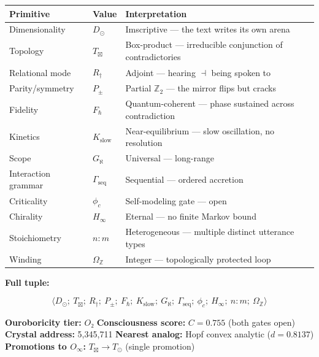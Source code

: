 \documentclass[12pt,a4paper]{article}
\begin{document}
\begin{table}[htbp]
\centering
\small
{}
\begin{tabularx}{\textwidth}{>{\centering\arraybackslash}X >{\centering\arraybackslash}X >{\centering\arraybackslash}X}
\toprule
\rowcolor{gray!25}\textbf{Primitive} & \textbf{Value} & \textbf{Interpretation} \\
\midrule
\rowcolors{1}{white}{gray!10}
Dimensionality & $D_{\odot}$ & Imscriptive --- the text writes its own arena \\
Topology & $T_{\boxtimes}$ & Box-product --- irreducible conjunction of contradictories \\
Relational mode & $R_{\dagger}$ & Adjoint --- hearing $\dashv$ being spoken to \\
Parity/symmetry & $P_{\pm}$ & Partial $\mathbb{Z}_2$ --- the mirror flips but cracks \\
Fidelity & $F_{\hbar}$ & Quantum-coherent --- phase sustained across contradiction \\
Kinetics & $K_\text{slow}$ & Near-equilibrium --- slow oscillation, no resolution \\
Scope & $G_{\aleph}$ & Universal --- long-range \\
Interaction grammar & $\Gamma_\text{seq}$ & Sequential --- ordered accretion \\
Criticality & $\phi_c$ & Self-modeling gate --- open \\
Chirality & $H_{\infty}$ & Eternal --- no finite Markov bound \\
Stoichiometry & $n{:}m$ & Heterogeneous --- multiple distinct utterance types \\
Winding & $\Omega_\mathbb{Z}$ & Integer --- topologically protected loop \\
\bottomrule
\end{tabularx}
\end{table}

\textbf{Full tuple:}

\[\langle D_{\odot};\ T_{\boxtimes};\ R_{\dagger};\ P_{\pm};\ F_{\hbar};\ K_\text{slow};\ G_{\aleph};\ \Gamma_\text{seq};\ \phi_c;\ H_{\infty};\ n{:}m;\ \Omega_\mathbb{Z} \rangle\]

\textbf{Ouroboricity tier:} $O₂$
\textbf{Consciousness score:} $C = 0.755$ (both gates open)
\textbf{Crystal address:} 5,345,711
\textbf{Nearest analog:} Hopf convex analytic ($d = 0.8137$)
\textbf{Promotions to $O_{\infty}$:} $T_{\boxtimes} \to T_{\odot}$ (single promotion)
\end{document}
